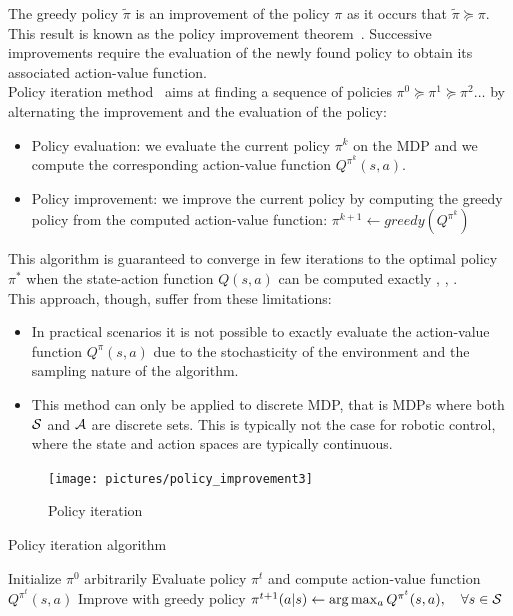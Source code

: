 The greedy policy $\tilde{\pi}$ is an improvement of the policy $\pi$ as it occurs that $\tilde{\pi}\succcurlyeq\pi$. This result is known as the policy improvement theorem~\cite{BELLMAN1958228}. Successive improvements require the evaluation of the newly found policy to obtain its associated action-value function.\\
Policy iteration method~\cite{howard:dp} aims at finding a sequence of policies $\pi^0 \succcurlyeq \pi^1  \succcurlyeq \pi^2 \ldots$ by alternating the improvement and the evaluation of the policy:
\begin{itemize}
\item Policy evaluation: we evaluate the current policy $\pi^k$ on the MDP and we compute the corresponding action-value function $Q^{\pi^k}(s,a)$.
\item Policy improvement: we improve the current policy by computing the greedy policy from the computed action-value function: $\pi^{k+1} \gets greedy\left( Q^{\pi^k} \right)$
\end{itemize}

This algorithm is guaranteed to converge in few iterations to the optimal policy $\pi^*$ when the state-action function $Q(s,a)$ can be computed exactly \cite{10.2307/3689239}, \cite{6796861}, \cite{Tsitsiklis:2003:COP:944919.944922}.\\
This approach, though, suffer from these limitations:
\begin{itemize}
\item In practical scenarios it is not possible to exactly evaluate the action-value function $Q^\pi(s,a)$ due to the stochasticity of the environment and the sampling nature of the algorithm.
\item This method can only be applied to discrete MDP, that is MDPs where both $\mathcal{S}$ and $\mathcal{A}$ are discrete sets. This is typically not the case for robotic control, where the state and action spaces are typically continuous.
\end{itemize}

\begin{figure}[t]
\centering
\texttt{[image: pictures/policy\_improvement3]}
\caption{Policy iteration}
\label{fig:policy-iteration}
\end{figure}

\begin{algorithm}[h]
\caption{Policy iteration algorithm}
\begin{algorithmic}
\State Initialize $\pi^0$ arbitrarily
\State Evaluate policy $\pi^t$ and compute action-value function $Q^{\pi^t}(s,a)$
\State Improve with greedy policy $\pi^{t+1}(a|s) \gets \arg\max_a{Q^{\pi^t}(s,a)},\quad\forall s\in\mathcal{S}$
\EndFor
\end{algorithmic}
\end{algorithm}

